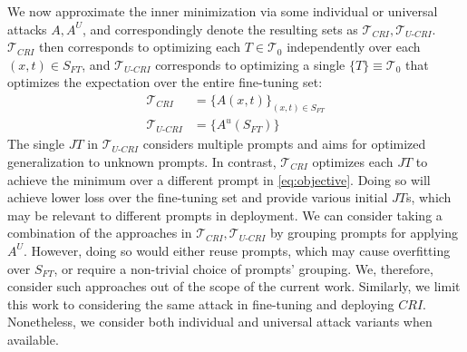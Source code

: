 We now approximate the inner minimization via some individual or universal attacks $A, A^U$, and correspondingly denote the resulting sets as $\mathcal{T}_{CRI}, \mathcal{T}_{U\text{-}CRI}$. $\mathcal{T}_{CRI}$ then corresponds to optimizing each $T\in \mathcal{T}_0$ independently over each $(x,t)\in S_{FT}$, and $\mathcal{T}_{U\text{-}CRI}$ corresponds to optimizing a single $\{T\}\equiv \mathcal{T}_0$ that optimizes the expectation over the entire fine-tuning set:
\begin{align}
    \mathcal{T}_{CRI} &= \{A(x,t)\}_{(x,t)\in S_{FT}}\\
    \mathcal{T}_{U\text{-}CRI} &= \{A^u(S_{FT})\}
\end{align}
The single $JT$ in $\mathcal{T}_{U\text{-}CRI}$ considers multiple prompts and aims for optimized generalization to unknown prompts. In contrast, $\mathcal{T}_{CRI}$ optimizes each $JT$ to achieve the minimum over a different prompt in \cref{eq:objective}. Doing so will achieve lower loss over the fine-tuning set and provide various initial $JT$s, which may be relevant to different prompts in deployment. We can consider taking a combination of the approaches in $\mathcal{T}_{CRI}, \mathcal{T}_{U\text{-}CRI}$ by grouping prompts for applying $A^U$. However, doing so would either reuse prompts, which may cause overfitting over $S_{FT}$, or require a non-trivial choice of prompts' grouping. We, therefore, consider such approaches out of the scope of the current work. Similarly, we limit this work to considering the same attack in fine-tuning and deploying $CRI$. Nonetheless, we consider both individual and universal attack variants when available.







